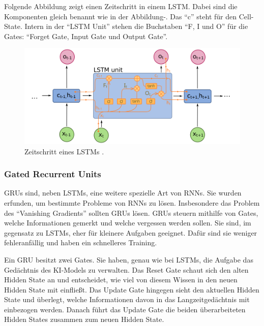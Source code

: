 Folgende Abbildung zeigt einen Zeitschritt in einem LSTM.
Dabei sind die Komponenten gleich benannt wie in der Abbildung-.
Das \enquote{c} steht für den Cell-State.
Intern in der \enquote{LSTM Unit} stehen die Buchstaben \enquote{F, I und O} für die Gates:
\enquote{Forget Gate, Input Gate und Output Gate}.
\begin{figure}[H]
    \centering
    \includegraphics[width=1\textwidth]{Graphics/LSTM_timestep}
    \caption[LSTM Zeitschritt]{Zeitschritt eines LSTMs \cite{wikimediaRNN}.}
    \label{fig:lstm_timestep}
\end{figure}

\subsubsection{Gated Recurrent Units}
GRUs sind, neben LSTMs, eine weitere spezielle Art von RNNs\cite{chung2014empirical}.
Sie wurden erfunden, um bestimmte Probleme von RNNs zu lösen.
Insbesondere das Problem des \enquote{Vanishing Gradients} sollten GRUs lösen.
GRUs steuern mithilfe von Gates, welche Informationen gemerkt und welche vergessen werden sollen.
Sie sind, im gegensatz zu LSTMs, eher für kleinere Aufgaben geeignet.
Dafür sind sie weniger fehleranfällig und haben ein schnelleres Training.

Ein GRU besitzt zwei Gates.
Sie haben, genau wie bei LSTMs, die Aufgabe das Gedächtnis des KI-Models zu verwalten.
Das Reset Gate schaut sich den alten Hidden State an und entscheidet,
wie viel von diesem Wissen in den neuen Hidden State mit einfließt.
Das Update Gate hingegen sieht den aktuellen Hidden State und überlegt,
welche Informationen davon in das Langzeitgedächtnis mit einbezogen werden.
Danach führt das Update Gate die beiden überarbeiteten Hidden States zusammen zum neuen Hidden State.

